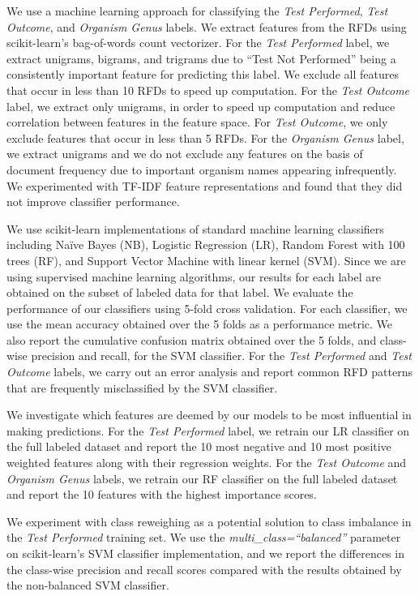 \documentclass[sigconf]{acmart}
\newcommand{\naive}{Na\"ive }
\begin{document}
We use a machine learning approach for classifying the \textit{Test Performed}, \textit{Test Outcome}, and \textit{Organism Genus} labels. We extract features from the RFDs using scikit-learn's bag-of-words count vectorizer. For the \textit{Test Performed} label, we extract unigrams, bigrams, and trigrams due to ``Test Not Performed'' being a consistently important feature for predicting this label. We exclude all features that occur in less than 10 RFDs to speed up computation. For the \textit{Test Outcome} label, we extract only unigrams, in order to speed up computation and reduce correlation between features in the feature space. For \textit{Test Outcome}, we only exclude features that occur in less than 5 RFDs. For the \textit{Organism Genus} label, we extract unigrams and we do not exclude any features on the basis of document frequency due to important organism names appearing infrequently. We experimented with TF-IDF feature representations and found that they did not improve classifier performance.

We use scikit-learn implementations of standard machine learning classifiers including \naive Bayes (NB), Logistic Regression (LR), Random Forest with 100 trees (RF), and Support Vector Machine with linear kernel (SVM). Since we are using supervised machine learning algorithms, our results for each label are obtained on the subset of labeled data for that label. We evaluate the performance of our classifiers using 5-fold cross validation. For each classifier, we use the mean accuracy obtained over the 5 folds as a performance metric. We also report the cumulative confusion matrix obtained over the 5 folds, and class-wise precision and recall, for the SVM classifier. For the \textit{Test Performed} and \textit{Test Outcome} labels, we carry out an error analysis and report common RFD patterns that are frequently misclassified by the SVM classifier.

We investigate which features are deemed by our models to be most influential in making predictions. For the \textit{Test Performed} label, we retrain our LR classifier on the full labeled dataset and report the 10 most negative and 10 most positive weighted features along with their regression weights. For the \textit{Test Outcome} and \textit{Organism Genus} labels, we retrain our RF classifier on the full labeled dataset and report the 10 features with the highest importance scores.

We experiment with class reweighing as a potential solution to class imbalance in the \textit{Test Performed} training set. We use the \textit{multi\_class=``balanced''} parameter on scikit-learn's SVM classifier implementation, and we report the differences in the class-wise precision and recall scores compared with the results obtained by the non-balanced SVM classifier.
\end{document}
